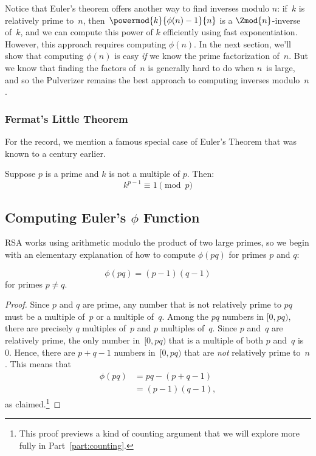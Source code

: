Notice that Euler's theorem offers another way to find inverses modulo
$n$: if~$k$ is relatively prime to~$n$,
then~$\powermod{k}{\phi(n)-1}{n}$ is a $\Zmod{n}$-inverse of~$k$, and
we can compute this power of $k$ efficiently using fast
exponentiation.  However, this approach requires computing $\phi(n)$.
In the next section, we'll show that computing $\phi(n)$ is easy
\emph{if} we know the prime factorization of~$n$.  But we know that
finding the factors of~$n$ is generally hard to do when $n$~is large,
and so the Pulverizer remains the best approach to computing inverses
modulo~$n$.

\subsubsection{Fermat's Little Theorem}

For the record, we mention a famous special case of Euler's Theorem
that was known to  a century
earlier.

\begin{corollary}\label{fermat_little}
Suppose $p$ is a prime and $k$ is not a multiple of $p$.  Then:
\[
k^{p-1} \equiv 1 \pmod{p}
\]
\end{corollary}

\subsection{Computing Euler's $\phi$ Function}

RSA works using arithmetic modulo the product of two large primes, so we begin with an
elementary explanation of how to compute $\phi(pq)$ for primes $p$ and $q$:

\begin{lemma}\label{phi_pq}    %
\[
\phi(pq) = (p-1) (q-1)
\]
for primes $p\neq q$.
\end{lemma}

\begin{proof}
Since $p$ and $q$ are prime, any number that is not relatively prime to $pq$ must be a
multiple of~$p$ or a multiple of~$q$.  Among the $pq$ numbers in $[0, pq)$, there are
  precisely $q$ multiples of~$p$ and $p$ multiples of~$q$.  Since $p$ and~$q$ are
  relatively prime, the only number in~$[0, pq)$ that is a multiple of both $p$ and~$q$ is
    0.  Hence, there are $p + q - 1$ numbers in~$[0, pq)$ that are \emph{not} relatively
      prime to~$n$.  This means that
\begin{align*}
    \phi(pq) & = pq - (p + q - 1) \\
& = (p - 1) (q - 1),
\end{align*}
as claimed.\footnote{This proof previews a kind of counting argument that we will explore
  more fully in Part~\ref{part:counting}.}
\end{proof}

